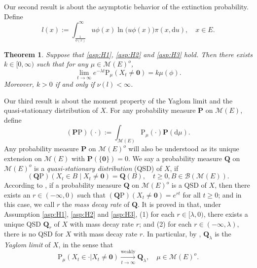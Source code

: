 \documentclass[12pt,a4paper]{amsart}
\numberwithin{equation}{section}
\theoremstyle{plain}
\newtheorem{thm}{Theorem}[section]
\theoremstyle{definition}
\theoremstyle{remark}
\begin{document}
	Our second result is about the asymptotic behavior of the extinction probability.
	Define
\begin{equation}\label{eq:M.35}
	l(x)
	:= \int_{\frac{1}{\phi(x)}}^\infty u\phi(x) \ln \big(u\phi(x)\big) \pi(x, \mathrm du),
	\quad x\in E.
\end{equation}

\begin{thm} \label{thm:E}
	Suppose that \eqref{asp:H1}, \eqref{asp:H2} and \eqref{asp:H3} hold.	
	Then there exists $k\in [0,\infty)$ such that for any $\mu \in \mathcal M(E)^o$,
\begin{equation}\label{eq:M.4}
	\lim_{t\rightarrow\infty} e^{-\lambda t}\mathrm P_\mu(X_t \neq \mathbf 0)
	=k\mu(\phi).
\end{equation}
	Moreover, $k>0$ if and only if $\nu(l)<\infty$.
\end{thm}

	Our third result is about the moment property of the Yaglom limit and the quasi-stationary distribution of $X$.
	For any probability measure $\mathbf P$ on $\mathcal M(E)$, define
\[
	(\mathbf P\mathrm P)(\cdot)
	:= \int_{\mathcal M(E)} \mathrm P_\mu(\cdot)\mathbf P({\mathrm d}\mu).
\]
	Any probability measure $\mathbf P$ on $\mathcal M(E)^o$ will also be understood as its unique extension on $\mathcal M(E)$ with  $\mathbf P(\{\mathbf 0\}) = 0$.
 We say a probability measure $\mathbf Q$ on $\mathcal M(E)^o$ is a \emph{quasi-stationary distribution} (QSD) of $X$, if
\[
	(\mathbf Q \mathrm P) \left( X_t \in B \middle | X_t \neq \mathbf 0 \right)
	= \mathbf Q(B),
	\quad t\geq 0, B \in \mathscr B(\mathcal M(E)).
\]
	According to \cite[(1.4)]{LiuRenSongSun2020}, 
	if a probability measure $\mathbf Q$ on $\mathcal M(E)^o$ is a QSD of $X$, then there exists an $r\in (-\infty, 0)$ such that $(\mathbf Q\mathrm P)(X_t \neq \mathbf 0) = e^{rt}$ for all $t\geq 0$; and in this case, we call $r$ the \emph{mass decay rate} of $\mathbf Q$.
	It is proved in \cite[Theorem 1.2]{LiuRenSongSun2020} that, under Assumption \eqref{asp:H1}, \eqref{asp:H2} and \eqref{asp:H3},
	(1) for each $r\in [\lambda, 0)$, there exists a unique QSD $\mathbf Q_r$ of $X$ with mass decay rate $r$;
	and (2) for each $r\in (-\infty, \lambda)$, there is no QSD for $X$ with mass decay rate $r$.
	In particular, by \cite[Theorem 1.1, Proposition 2.5]{LiuRenSongSun2020}, 
	$\mathbf Q_\lambda$ is the \emph{Yaglom limit} of $X$, in the sense that
\begin{equation}
	\mathrm P_\mu(X_t \in \cdot | X_t \neq \mathbf 0)
	\xrightarrow[t\to \infty]{\text{weakly}} \mathbf Q_\lambda,
	\quad \mu \in \mathcal M(E)^o.
\end{equation}
\end{document}
